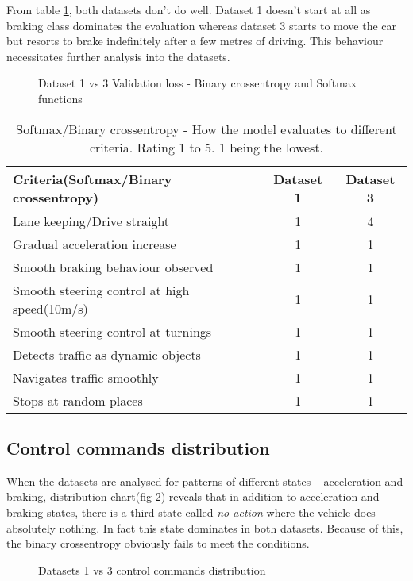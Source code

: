 From table \ref{table:softmaxandbce}, both datasets don't do well. Dataset 1 doesn't start
at all as braking class dominates the evaluation whereas dataset 3 starts to move the car
but resorts to brake indefinitely after a few metres of driving. This behaviour
necessitates further analysis into the datasets.
\begin{figure}[!ht]
	\centering
    \def\svgwidth{\textwidth}
    
    \caption{Dataset 1 vs 3 Validation loss - Binary crossentropy and Softmax functions}
    \label{fig:ds1andd3SoftactivatonBCE}
\end{figure}

\begin{table}[h]
    \centering
\begin{tabular}{lcc}
    \toprule
    Criteria(Softmax/Binary crossentropy)  & Dataset 1 & Dataset 3 \\\midrule
    Lane keeping/Drive straight  & 1 & 4  \\
    Gradual acceleration increase & 1 & 1\\
    Smooth braking behaviour observed & 1 & 1 \\
    Smooth steering control at high speed(10m/s) & 1 & 1 \\
    Smooth steering control at turnings & 1 & 1\\
    Detects traffic as dynamic objects & 1 & 1\\
    Navigates traffic smoothly & 1 & 1\\
    Stops at random places & 1 & 1 \\\bottomrule
\end{tabular}
\caption{Softmax/Binary crossentropy - How the model evaluates to different criteria.
Rating 1 to 5. 1 being the lowest.}
\label{table:softmaxandbce}
\end{table}
\subsection*{Control commands distribution}
When the datasets are analysed for patterns of different states -- acceleration and
braking, distribution chart(fig \ref{fig:datasetscomparectrlcmds}) reveals that in addition to
acceleration and braking states, there is a third state called \textit{no action} where
the vehicle does absolutely nothing. In fact this state dominates in both datasets.
Because of this, the binary crossentropy obviously fails to meet the conditions.
\begin{figure}[!ht]
    \centering
    \def\svgwidth{\textwidth}
    
    \caption{Datasets 1 vs 3 control commands distribution}
    \label{fig:datasetscomparectrlcmds}
\end{figure}


